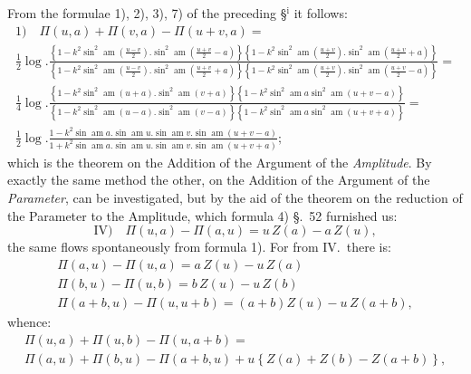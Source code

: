 \documentclass{article}
\begin{document}
From the formulae 1), 2), 3), 7) of the preceding §$^{\mathrm{i}}$ it follows:
\[
\begin{gathered}
\text{1)}\quad \Pi(u,a)+\Pi(v,a)-\Pi(u+v,a)=\\[1.5ex]
\frac{1}{2}\log.\frac{\left\{1-k^{2}\sin^{2}\operatorname{am}\left(\frac{u-v}{2}\right).\sin^{2}\operatorname{am}\left(\frac{u+v}{2}-a\right)\right\}\left\{1-k^{2}\sin^{2}\operatorname{am}\left(\frac{u+v}{2}\right).\sin^{2}\operatorname{am}\left(\frac{u+v}{2}+a\right)\right\}}{\left\{1-k^{2}\sin^{2}\operatorname{am}\left(\frac{u-v}{2}\right).\sin^{2}\operatorname{am}\left(\frac{u+v}{2}+a\right)\right\}\left\{1-k^{2}\sin^{2}\operatorname{am}\left(\frac{u+v}{2}\right).\sin^{2}\operatorname{am}\left(\frac{u+v}{2}-a\right)\right\}}=\\[1.5ex]
\frac{1}{4}\log.\frac{\left\{1-k^{2}\sin^{2}\operatorname{am}(u+a).\sin^{2}\operatorname{am}(v+a)\right\}\left\{1-k^{2}\sin^{2}\operatorname{am}a\sin^{2}\operatorname{am}(u+v-a)\right\}}{\left\{1-k^{2}\sin^{2}\operatorname{am}(u-a).\sin^{2}\operatorname{am}(v-a)\right\}\left\{1-k^{2}\sin^{2}\operatorname{am}a\sin^{2}\operatorname{am}(u+v+a)\right\}}=\\[1.5ex]
\frac{1}{2}\log.\frac{1-k^{2}\sin\operatorname{am}a.\sin\operatorname{am}u.\sin\operatorname{am}v.\sin\operatorname{am}(u+v-a)}{1+k^{2}\sin\operatorname{am}a.\sin\operatorname{am}u.\sin\operatorname{am}v.\sin\operatorname{am}(u+v+a)};
\end{gathered}
\]
which is the theorem on the Addition of the Argument of the \emph{Amplitude}. By exactly the same method the other, on the Addition of the Argument of the \emph{Parameter}, can be investigated, but by the aid of the theorem on the reduction of the Parameter to the Amplitude, which formula 4) §.\ 52 furnished us:
\[
\text{IV)}\quad \Pi(u,a)-\Pi(a,u)=u\,Z(a)-a\,Z(u),
\]
the same flows spontaneously from formula 1). For from IV.\ there is:
\[
\begin{gathered}
\Pi(a,u)-\Pi(u,a)=a\,Z(u)-u\,Z(a)\\
\Pi(b,u)-\Pi(u,b)=b\,Z(u)-u\,Z(b)\\
\Pi(a+b,u)-\Pi(u,u+b)=(a+b)Z(u)-u\,Z(a+b),
\end{gathered}
\]
whence:
\[
\begin{gathered}
\Pi(u,a)+\Pi(u,b)-\Pi(u,a+b)=\\
\Pi(a,u)+\Pi(b,u)-\Pi(a+b,u)+u\left\{Z(a)+Z(b)-Z(a+b)\right\},
\end{gathered}
\]
\end{document}
